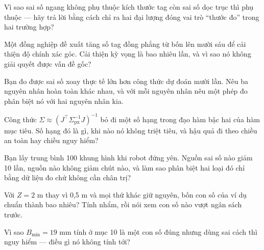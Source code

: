 \documentclass[../../marker.tex]{subfiles}
\begin{document}
\begin{tukiem}
\item Vì sao sai số ngang không phụ thuộc kích thước tag còn sai số dọc trục thì phụ thuộc --- hãy trả lời bằng cách chỉ ra hai đại lượng đóng vai trò ``thước đo'' trong hai trường hợp?
\item Một đồng nghiệp đề xuất tăng số tag đồng phẳng từ bốn lên mười sáu để cải thiện độ chính xác góc. Cải thiện kỳ vọng là bao nhiêu lần, và vì sao nó không giải quyết được vấn đề gốc?
\item Bạn đo được sai số xoay thực tế lớn hơn công thức dự đoán mười lần. Nêu ba nguyên nhân hoàn toàn khác nhau, và với mỗi nguyên nhân nêu một phép đo phân biệt nó với hai nguyên nhân kia.
\item Công thức \(\Sigma \approx (J^\top\Sigma_{\text{px}}^{-1}J)^{-1}\) bỏ đi một số hạng trong đạo hàm bậc hai của hàm mục tiêu. Số hạng đó là gì, khi nào nó không triệt tiêu, và hậu quả đi theo chiều an toàn hay chiều nguy hiểm?
\item Bạn lấy trung bình 100 khung hình khi robot đứng yên. Nguồn sai số nào giảm 10 lần, nguồn nào không giảm chút nào, và làm sao phân biệt hai loại đó chỉ bằng dữ liệu đo chứ không cần chân trị?
\item Với \(Z = 2\) m thay vì 0,5 m và mọi thứ khác giữ nguyên, bốn con số của ví dụ chuẩn thành bao nhiêu? Tính nhẩm, rồi nói xem con số nào vượt ngân sách trước.
\item Vì sao \(B_{\min} = 19\) mm tính ở mục 10 là một con số đúng nhưng dùng sai cách thì nguy hiểm --- điều gì nó không tính tới?
\end{tukiem}
\ifSubfilesClassLoaded{\printbibliography[title={Nguồn}]}{}
\end{document}
